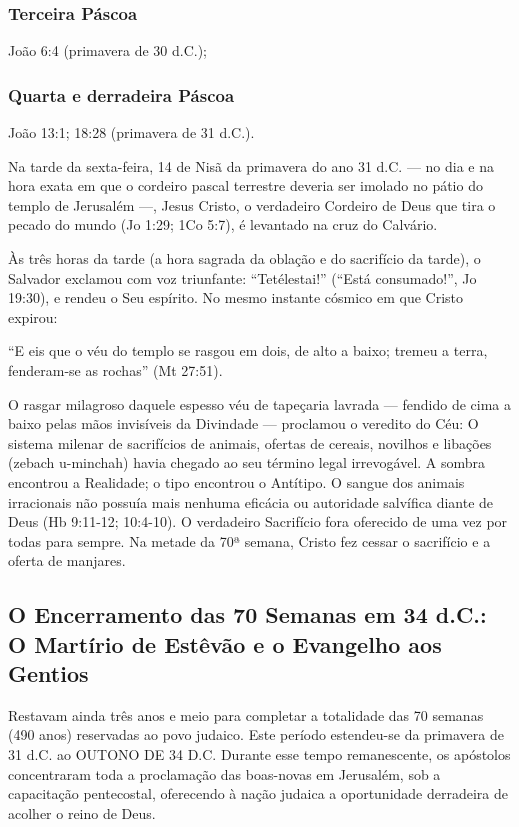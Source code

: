 \subsubsection*{Terceira Páscoa}
João 6:4 (primavera de 30 d.C.);

\subsubsection*{Quarta e derradeira Páscoa}
João 13:1; 18:28 (primavera de 31 d.C.).

Na tarde da sexta-feira, 14 de Nisã da primavera do ano 31 d.C. — no dia e na hora exata em que o cordeiro pascal terrestre deveria ser imolado no pátio do templo de Jerusalém —, Jesus Cristo, o verdadeiro Cordeiro de Deus que tira o pecado do mundo (Jo 1:29; 1Co 5:7), é levantado na cruz do Calvário.

Às três horas da tarde (a hora sagrada da oblação e do sacrifício da tarde), o Salvador exclamou com voz triunfante: ``Tetélestai!'' (``Está consumado!'', Jo 19:30), e rendeu o Seu espírito. No mesmo instante cósmico em que Cristo expirou:

``E eis que o véu do templo se rasgou em dois, de alto a baixo; tremeu a terra, fenderam-se as rochas'' (Mt 27:51).

O rasgar milagroso daquele espesso véu de tapeçaria lavrada — fendido de cima a baixo pelas mãos invisíveis da Divindade — proclamou o veredito do Céu: O sistema milenar de sacrifícios de animais, ofertas de cereais, novilhos e libações (zebach u-minchah) havia chegado ao seu término legal irrevogável. A sombra encontrou a Realidade; o tipo encontrou o Antítipo. O sangue dos animais irracionais não possuía mais nenhuma eficácia ou autoridade salvífica diante de Deus (Hb 9:11-12; 10:4-10). O verdadeiro Sacrifício fora oferecido de uma vez por todas para sempre. Na metade da 70ª semana, Cristo fez cessar o sacrifício e a oferta de manjares.



\subsection{O Encerramento das 70 Semanas em 34 d.C.: O Martírio de Estêvão e o Evangelho aos Gentios}


Restavam ainda três anos e meio para completar a totalidade das 70 semanas (490 anos) reservadas ao povo judaico. Este período estendeu-se da primavera de 31 d.C. ao OUTONO DE 34 D.C. Durante esse tempo remanescente, os apóstolos concentraram toda a proclamação das boas-novas em Jerusalém, sob a capacitação pentecostal, oferecendo à nação judaica a oportunidade derradeira de acolher o reino de Deus.

